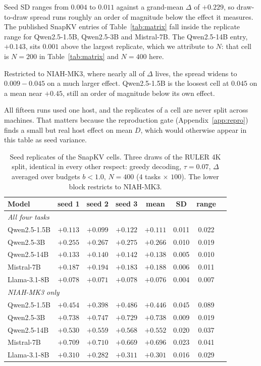 Seed SD ranges from $0.004$ to $0.011$ against a grand-mean $\Delta$ of
$+0.229$, so draw-to-draw spread runs roughly an order of magnitude below the
effect it measures. The published SnapKV entries of Table~\ref{tab:matrix} fall
inside the replicate range for Qwen2.5-1.5B, Qwen2.5-3B and Mistral-7B. The
Qwen2.5-14B entry, $+0.143$, sits $0.001$ above the largest replicate, which we
attribute to $N$: that cell is $N = 200$ in Table~\ref{tab:matrix} and
$N = 400$ here.

Restricted to NIAH-MK3, where nearly all of $\Delta$ lives, the spread widens to
$0.009 - 0.045$ on a much larger effect. Qwen2.5-1.5B is the loosest cell at
$0.045$ on a mean near $+0.45$, still an order of magnitude below its own
effect.

All fifteen runs used one host, and the replicates of a cell are never split
across machines. That matters because the reproduction gate
(Appendix~\ref{app:repro}) finds a small but real host effect on mean $D$, which
would otherwise appear in this table as seed variance.

\begin{table}[h]
\centering
\caption{Seed replicates of the SnapKV cells. Three draws of the RULER 4K split,
identical in every other respect: greedy decoding, $\tau = 0.07$, $\Delta$
averaged over budgets $b < 1.0$, $N = 400$ ($4$ tasks $\times$ $100$). The
lower block restricts to NIAH-MK3.}
\label{tab:seed-variance}
\small
\begin{tabular}{lccccccc}
\toprule
Model & seed 1 & seed 2 & seed 3 & mean & SD & range \\
\midrule
\multicolumn{7}{l}{\emph{All four tasks}} \\
Qwen2.5-1.5B & $+0.113$ & $+0.099$ & $+0.122$ & $+0.111$ & 0.011 & 0.022 \\
Qwen2.5-3B   & $+0.255$ & $+0.267$ & $+0.275$ & $+0.266$ & 0.010 & 0.019 \\
Qwen2.5-14B  & $+0.133$ & $+0.140$ & $+0.142$ & $+0.138$ & 0.005 & 0.010 \\
Mistral-7B   & $+0.187$ & $+0.194$ & $+0.183$ & $+0.188$ & 0.006 & 0.011 \\
Llama-3.1-8B & $+0.078$ & $+0.071$ & $+0.078$ & $+0.076$ & 0.004 & 0.007 \\
\midrule
\multicolumn{7}{l}{\emph{NIAH-MK3 only}} \\
Qwen2.5-1.5B & $+0.454$ & $+0.398$ & $+0.486$ & $+0.446$ & 0.045 & 0.089 \\
Qwen2.5-3B   & $+0.738$ & $+0.747$ & $+0.729$ & $+0.738$ & 0.009 & 0.019 \\
Qwen2.5-14B  & $+0.530$ & $+0.559$ & $+0.568$ & $+0.552$ & 0.020 & 0.037 \\
Mistral-7B   & $+0.709$ & $+0.710$ & $+0.669$ & $+0.696$ & 0.023 & 0.041 \\
Llama-3.1-8B & $+0.310$ & $+0.282$ & $+0.311$ & $+0.301$ & 0.016 & 0.029 \\
\bottomrule
\end{tabular}
\end{table}

